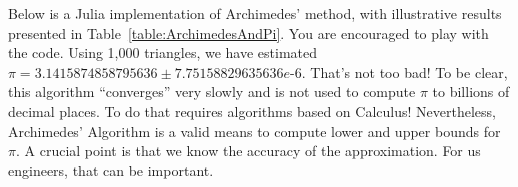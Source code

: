 \begin{itemize}










\end{itemize}
 



Below is a Julia implementation of Archimedes' method, with illustrative results presented in Table~\ref{table:ArchimedesAndPi}. You are encouraged to play with the code. Using 1,000 triangles, we have estimated $ \pi = 3.1415874858795636 \pm 7.75158829635636e\text{-}6$. That's not too bad! To be clear, this algorithm ``converges'' very slowly and is not used to compute $\pi$ to billions of decimal places. To do that requires algorithms based on Calculus! Nevertheless, Archimedes' Algorithm is a valid means to compute lower and upper bounds for $\pi$. A crucial point is that we know the accuracy of the approximation. For us engineers, that can be important. 


